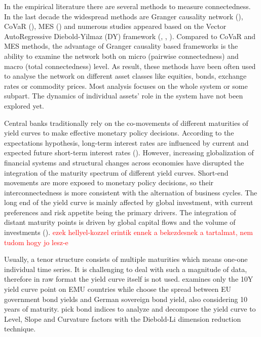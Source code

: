\documentclass[12pt,bibliography=totoc]{article}
\begin{document}
In the empirical literature there are several methods to measure connectedness. In the last decade the widespread methods are Granger causality network (\cite{billio2012econometric}), CoVaR (\cite{adrian2008federal}), MES (\cite{acharya2012capital}) and numerous studies appeared based on the Vector AutoRegressive Diebold-Yilmaz (DY) framework (\cite{diebold2009measuring}, \cite{diebold2012better}, \cite{diebold2014network}). Compared to CoVaR and MES methods, the advantage of Granger causality based frameworks is the ability to examine the network both on micro (pairwise connectedness) and macro (total connectedness) level. As result, these methods have been often used to analyse the network on different asset classes like equities, bonds, exchange rates or commodity prices. Most analysis focuses on the whole system or some subpart. The dynamics of individual assets' role in the system have not been explored yet. %


Central banks traditionally rely on the co-movements of different maturities of yield curves to make effective monetary policy decisions. According to the expectations hypothesis, long-term interest rates are influenced by current and expected future short-term interest rates (\cite{laopodis2004monetary}). However, increasing globalization of financial systems and structural changes across economies have disrupted the integration of the maturity spectrum of different yield curves. Short-end movements are more exposed to monetary policy decisions, so their interconnectedness is more consistent with the alternation of business cycles. The long end of the yield curve is mainly affected by global investment, with current preferences and risk appetite being the primary drivers. The integration of distant maturity points is driven by global capital flows and the volume of investments (\cite{ilmanen1995time}). \textcolor{red}{ezek hellyel-kozzel erintik ennek a bekezdesnek a tartalmat, nem tudom hogy jo lesz-e}

Usually, a tenor structure consists of multiple maturities which means one-one individual time series. It is challenging to deal with such a magnitude of data, therefore in raw format the yield curve itself is not used. \cite{fernandez2016using} examines only the 10Y yield curve point on EMU countries while \cite{claeys2014measuring} choose the spread between EU government bond yields and German sovereign bond yield, also considering 10 years of maturity. \cite{ahmad2018financial} pick bond indices to analyze and \cite{sowmya2016linkages}
decompose the yield curve to Level, Slope and Curvature factors with the Diebold-Li dimension reduction technique. 
\end{document}
